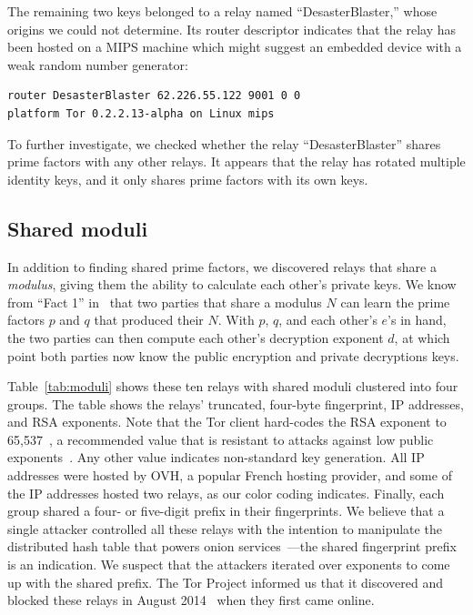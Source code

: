 The remaining two keys belonged to a relay named ``DesasterBlaster,'' whose
origins we could not determine. Its router descriptor indicates that the relay
has been hosted on a MIPS machine which might suggest an embedded device with a
weak random number generator:

\begin{verbatim}
router DesasterBlaster 62.226.55.122 9001 0 0
platform Tor 0.2.2.13-alpha on Linux mips
\end{verbatim}

To further investigate, we checked whether the relay ``DesasterBlaster'' shares
prime factors with any other relays. It appears that the relay has rotated
multiple identity keys, and it only shares prime factors with its own keys.


\subsection{Shared moduli}
\label{sec:shared-moduli}
In addition to finding shared prime factors, we discovered relays that share a
\emph{modulus}, giving them the ability to calculate each other's private keys.
We know from ``Fact 1'' in~\cite[\S~1.1]{Boneh1999a} that two parties 
that share a modulus $N$ can learn the prime factors $p$ and $q$ that produced their $N$. With $p$, $q$, and each other's $e$'s in hand, the two parties can then compute each other's decryption exponent $d$, at which point both parties now know the public encryption and private decryptions keys. 

Table~\ref{tab:moduli} shows these ten relays with shared moduli clustered into four groups. The table shows the relays' truncated,
four-byte fingerprint, IP addresses, and RSA exponents.  Note that the Tor
client hard-codes the RSA exponent to 65,537~\cite[\S~0.3]{torspec}, a
recommended value that is resistant to attacks against low public
exponents~\cite[\S~4]{Boneh1999a}.  Any other value indicates non-standard key
generation.  All IP addresses were hosted by OVH, a popular French hosting
provider, and some of the IP addresses hosted two relays, as our color coding
indicates.  Finally, each group shared a four- or five-digit prefix in their
fingerprints.  We believe that a single attacker controlled all these relays
with the intention to manipulate the distributed hash table that powers onion
services~\cite{Biryukov2013a}---the shared fingerprint prefix is an indication.
We suspect that the attackers iterated over exponents to come up with the shared
prefix.  The Tor Project informed us that it discovered and blocked these relays
in August 2014~\cite{tor-priv1} when they first came online.

